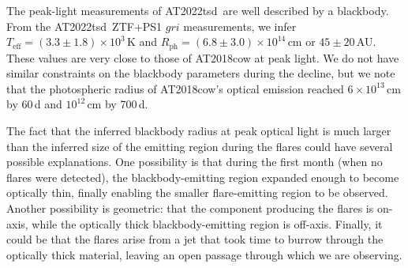 \documentclass{nature_plusfigure}
\newcommand{\at}{AT2022tsd}
\begin{document}
\begin{methods}

The peak-light measurements of \at\ are well described by a blackbody. From the \at\ ZTF+PS1 $gri$ measurements, we infer $T_\mathrm{eff}=(3.3\pm 1.8) \times 10^{3}$\,K and $R_\mathrm{ph}=(6.8\pm3.0)\times10^{14}\,$cm or $45\pm20$\,AU. These values are very close to those of AT2018cow at peak light. We do not have similar constraints on the blackbody parameters during the decline, but we note that the photospheric radius of AT2018cow's optical emission reached $6\times10^{13}\,$cm by 60\,d\cite{Perley2019,Chen2023a} and $10^{12}\,$cm by 700\,d\cite{Chen2023b}.

The fact that the inferred blackbody radius at peak optical light is much larger than the inferred size of the emitting region during the flares could have several possible explanations. One possibility is that during the first month (when no flares were detected), the blackbody-emitting region expanded enough to become optically thin, finally enabling the smaller flare-emitting region to be observed. 
Another possibility is geometric: that the component producing the flares is on-axis, while the optically thick blackbody-emitting region is off-axis.
Finally, it could be that the flares arise from a jet that took time to burrow through the optically thick material, leaving an open passage through which we are observing.


\end{methods}
\end{document}
